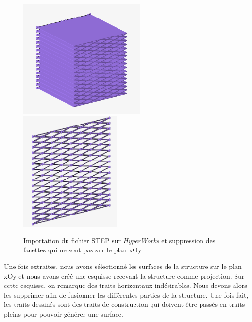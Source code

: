 \documentclass[a4paper]{article}
\begin{document}
	\begin{figure}[H]
		\centering
		\includegraphics[height=6cm]{Images/8/8_1/hm_step.png}
		\includegraphics[height=6cm]{Images/8/8_1/hm_xoy.png}\\
		\caption{Importation du fichier STEP sur \textit{\textit{HyperWorks}} et suppression des facettes qui ne sont pas sur le plan xOy}
	\end{figure}
	\newpage
	
	\hspace{0.5cm}Une fois extraites, nous avons sélectionné les surfaces de la structure sur le plan xOy et nous avons créé une esquisse recevant la structure comme projection. Sur cette esquisse, on remarque des traits horizontaux indésirables. Nous devons alors les supprimer afin de fusionner les différentes parties de la structure. Une fois fait, les traits dessinés sont des traits de construction qui doivent-être passés en traits pleins pour pouvoir générer une surface.
	
\end{document}
